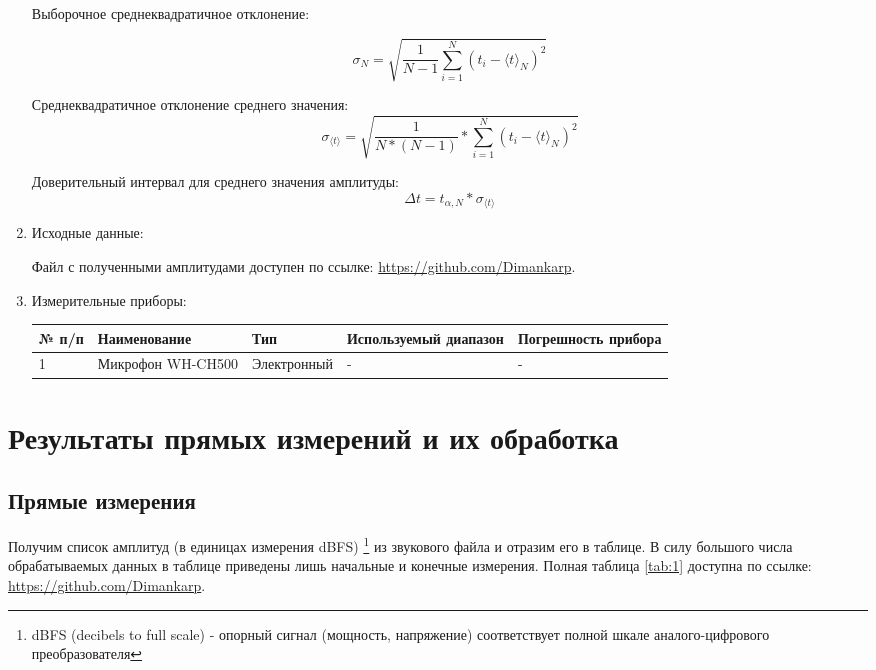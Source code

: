 \documentclass[12pt, a4paper]{article}
\begin{document}
\begin{enumerate}
Выборочное среднеквадратичное отклонение:

\begin{equation}
\sigma_N = \sqrt{\frac{1}{N-1}\sum^N_{i=1} (t_i - \langle t \rangle_N)^2}
\end{equation}

Среднеквадратичное отклонение среднего значения:
\begin{equation}
\sigma_{\langle t \rangle} = \sqrt{ \frac{1}{N * (N-1)} * \sum^N_{i=1} (t_i - \langle t \rangle_N)^2}
\end{equation}

Доверительный интервал для среднего значения амплитуды:
\begin{equation}
\Delta t = t_{\alpha, N} * \sigma_{\langle t \rangle} 
\end{equation}
\item Исходные данные:

Файл с полученными амплитудами доступен по ссылке: \url{https://github.com/Dimankarp}.

\item Измерительные приборы:

\begin{center}

\begin{table}[h!]
\begin{tabular}{|l|l|l|l|l|}
\hline
№ п/п & Наименование & Тип & Используемый диапазон & Погрешность прибора\\
\hline
1 & Микрофон WH-CH500 & Электронный & -  & -\\
\hline
\end{tabular}
\end{table}
\end{center}
\end{enumerate}
\section{Результаты прямых измерений и их обработка}
\subsection{Прямые измерения}

Получим список амплитуд (в единицах измерения dBFS) \footnote{dBFS (decibels to full scale) - опорный сигнал (мощность, напряжение) соответствует полной шкале аналого-цифрового преобразователя} из звукового файла и отразим его в таблице. В силу большого числа обрабатываемых данных в таблице приведены лишь начальные и конечные измерения. Полная таблица \ref{tab:1} доступна по ссылке: \url{https://github.com/Dimankarp}.
\end{document}
